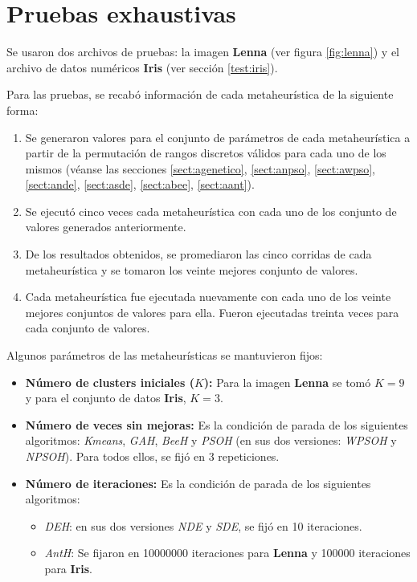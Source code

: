 \chapter{Pruebas exhaustivas}
\label{apendicea}

	Se usaron dos archivos de pruebas: la imagen \textbf{Lenna} (ver figura \ref{fig:lenna})
y el archivo de datos numéricos \textbf{Iris} (ver sección \ref{test:iris}).

    Para las pruebas, se recabó información de cada metaheurística de la
siguiente forma:
\begin{enumerate}
    \item Se generaron valores para el conjunto de parámetros de cada
metaheurística a partir de la permutación de rangos discretos válidos para cada
uno de los mismos (véanse las secciones  \ref{sect:agenetico}, \ref{sect:anpso},
\ref{sect:awpso}, \ref{sect:ande}, \ref{sect:asde}, \ref{sect:abee},
\ref{sect:aant}).
    \item Se ejecutó cinco veces cada metaheurística con cada uno de los conjunto de
valores generados anteriormente.
    \item De los resultados obtenidos, se promediaron las cinco corridas de cada
metaheurística y se tomaron los veinte mejores conjunto de valores.
    \item Cada metaheurística fue ejecutada nuevamente con cada uno de los veinte
mejores conjuntos de valores para ella. Fueron ejecutadas treinta veces para
cada conjunto de valores.
\end{enumerate}

	Algunos parámetros de las metaheurísticas se mantuvieron fijos:
\begin{itemize}
	\item {\bf Número de clusters iniciales ($K$):} Para la imagen {\bf Lenna} se
tomó $K=9$ y para el conjunto de datos {\bf Iris}, $K=3$.

	\item {\bf Número de veces sin mejoras:} Es la condición de parada de los
siguientes algoritmos: \emph{Kmeans}, \emph{GAH}, \emph{BeeH} y \emph{PSOH} (en sus
dos versiones: \emph{WPSOH} y \emph{NPSOH}). Para todos ellos, se fijó en 3
repeticiones.

	\item {\bf Número de iteraciones:} Es la condición de parada de los siguientes
algoritmos:
    \begin{itemize}
        \item \emph{DEH}: en sus dos versiones \emph{NDE} y \emph{SDE}, se fijó
    en 10 iteraciones.
        \item \emph{AntH}: Se fijaron en 10000000 iteraciones para {\bf Lenna} y
    100000 iteraciones para {\bf Iris}.
    \end{itemize}
\end{itemize}

